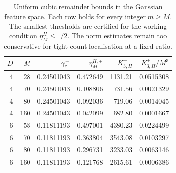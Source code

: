 \begin{table}[tbp]
\centering\small
\caption{Uniform cubic remainder bounds in the Gaussian feature space. Each row holds for every integer $m\geq M$. The smallest thresholds are certified for the working condition $\eta_M^H\leq1/2$. The norm estimates remain too conservative for tight count localisation at a fixed ratio.}
\label{tab:hilbert-remainders}
\begin{tabular}{rrrrrr}
\toprule
$D$ & $M$ & $\gamma_{\rm e}^-$ & $\eta_M^{H,+}$ & $K_{3,H}^+$ & $K_{3,H}^+/M^3$\\
\midrule
4 & 28 & 0.24501043 & 0.472649 & 1131.21 & 0.0515308\\
4 & 70 & 0.24501043 & 0.108806 & 731.56 & 0.0021329\\
4 & 80 & 0.24501043 & 0.092036 & 719.06 & 0.0014045\\
4 & 160 & 0.24501043 & 0.042099 & 682.80 & 0.0001667\\
6 & 58 & 0.11811193 & 0.497001 & 4380.23 & 0.0224499\\
6 & 70 & 0.11811193 & 0.363804 & 3543.08 & 0.0103297\\
6 & 80 & 0.11811193 & 0.296731 & 3233.03 & 0.0063146\\
6 & 160 & 0.11811193 & 0.121768 & 2615.61 & 0.0006386\\
\bottomrule
\end{tabular}
\end{table}

